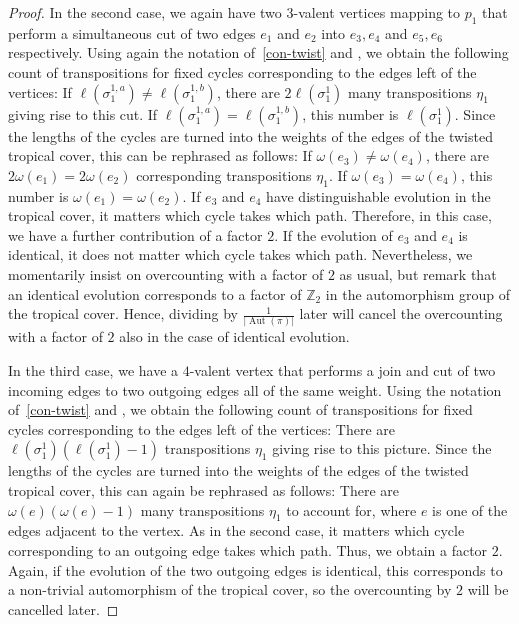 \documentclass[10pt]{amsart}
\theoremstyle{plain}
\theoremstyle{definition}
\theoremstyle{definition}
\theoremstyle{plain}
\theoremstyle{plain}
\theoremstyle{remark}
\theoremstyle{plain}
\theoremstyle{plain}
\DeclareMathOperator{\Aut}{Aut}
\begin{document}
\begin{proof}
In the second case, we again have two $3$-valent vertices mapping to $p_1$ that perform a simultaneous cut of two edges $e_1$ and $e_2$ into $e_3,e_4$ and $e_5,e_6$ respectively.  Using again the notation of~\cref{con-twist} and \cite[Theorem 2.12]{BF21}, we obtain the following count of transpositions for fixed cycles corresponding to the edges left of the vertices: If $\ell(\sigma_1^{1,a})\neq\ell(\sigma_1^{1,b})$, there are $2\ell(\sigma_1^1)$ many transpositions $\eta_1$ giving rise to this cut. If $\ell(\sigma_1^{1,a})=\ell(\sigma_1^{1,b})$, this number is $\ell(\sigma_1^1)$.
    Since the lengths of the cycles are turned into the weights of the edges of the twisted tropical cover, this can be rephrased as follows:    If $\omega(e_3)\neq\omega(e_4)$, there are $2\omega(e_1)=2\omega(e_2)$ corresponding transpositions $\eta_1$. If $\omega(e_3)=\omega(e_4)$, this number is $\omega(e_1)=\omega(e_2)$. If $e_3$ and $e_4$ have distinguishable evolution in the tropical cover, it matters which cycle takes which path. Therefore, in this case, we have a further contribution of a factor $2$. If the evolution of $e_3$ and $e_4$ is identical, it does not matter which cycle takes which path. Nevertheless, we momentarily insist on overcounting with a factor of $2$ as usual, but remark that an identical evolution     corresponds to a factor of $\mathbb{Z}_2$ in the automorphism group of the tropical cover. Hence, dividing by $\frac{1}{|\Aut(\pi)|}$ later will cancel the overcounting with a factor of $2$ also in the case of identical evolution.
    
In the third case, we have a $4$-valent vertex that performs a join and cut of two incoming edges to two outgoing edges all of the same weight. Using the notation of~\cref{con-twist} and \cite[Theorem 2.12]{BF21}, we obtain the following count of transpositions for fixed cycles corresponding to the edges left of the vertices:
There are $\ell(\sigma_1^1)(\ell(\sigma_1^1)-1)$ transpositions $\eta_1$ giving rise to this picture. Since the lengths of the cycles are turned into the weights of the edges of the twisted tropical cover, this can again be rephrased as follows:
There are $\omega(e)(\omega(e)-1)$ many transpositions $\eta_1$ to account for, where $e$ is one of the edges adjacent to the vertex. As in the second case, it matters which cycle corresponding to an outgoing edge takes which path. Thus, we obtain a factor $2$. Again, if the evolution of the two outgoing edges is identical, this corresponds to a non-trivial automorphism of the tropical cover, so the overcounting by $2$ will be cancelled later.


\end{proof}
\end{document}
